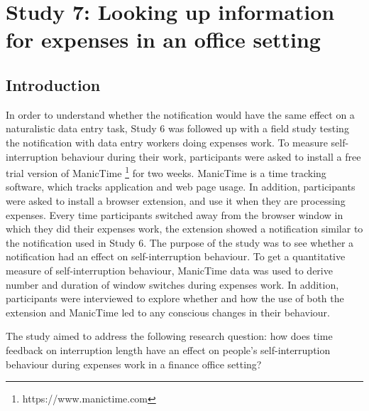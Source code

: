 \section{Study 7: Looking up information for expenses in an office setting}
\subsection{Introduction}
In order to understand whether the notification would have the same effect on a naturalistic data entry task, Study 6 was followed up with a field study testing the notification with data entry workers doing expenses work. To measure self-interruption behaviour during their work, participants were asked to install a free trial version of ManicTime \footnote{https://www.manictime.com} for two weeks. ManicTime is a time tracking software, which tracks application and web page usage. In addition, participants were asked to install a browser extension, and use it when they are processing expenses. Every time participants switched away from the browser window in which they did their expenses work, the extension showed a notification similar to the notification used in Study 6. The purpose of the study was to see whether a notification had an effect on self-interruption behaviour. To get a quantitative measure of self-interruption behaviour, ManicTime data was used to derive number and duration of window switches during expenses work. In addition, participants were interviewed to explore whether and how the use of both the extension and ManicTime led to any conscious changes in their behaviour.
 
The study aimed to address the following research question: how does time feedback on interruption length have an effect on people's self-interruption behaviour during expenses work in a finance office setting? 

